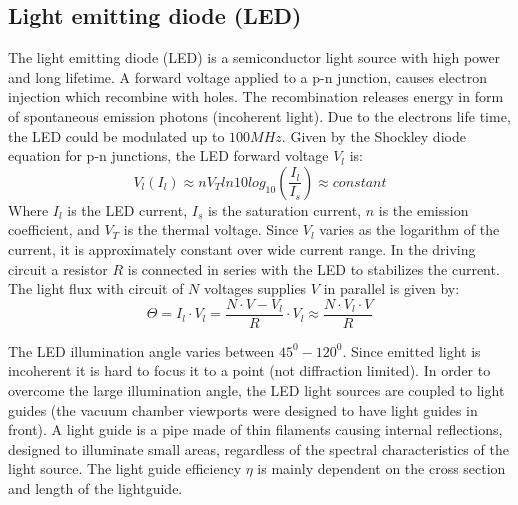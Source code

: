 \documentclass[\main/master.tex]{subfiles}
\begin{document}
\subsection{Light emitting diode (LED)}
The light emitting diode (LED) is a semiconductor light source with high power and long lifetime. A forward voltage applied to a p-n junction, causes electron injection which recombine with holes. The recombination releases energy in form of spontaneous emission photons (incoherent light). Due to the electrons life time, the LED could be modulated up to $100MHz$. Given by the Shockley diode equation for p-n junctions, the LED forward voltage $V_l$ is:
\begin{equation}
V_l(I_l) \approx n V_T ln10 log_{10} (\frac{I_l}{I_s})\approx constant \label{eqn:led voltage}
\end{equation}
Where $I_l$ is the LED current, $I_s$ is the saturation current, $n$ is the emission coefficient, and $V_T$ is the thermal voltage. Since $V_l$ varies as the logarithm of the current, it is approximately constant over wide current range. In the driving circuit a resistor $R$ is connected in series with the LED to stabilizes the current. The light flux with circuit of $N$ voltages supplies $V$ in parallel is given by:
\begin{equation}
\Theta = I_l\cdot V_l  =\frac{N\cdot V-V_l}{R}\cdot V_l\approx \frac{N\cdot V_l\cdot V}{R}\label{eqn:led power}
\end{equation}
\par\noindent
The LED illumination angle varies between $45^0-120^0$. Since emitted light is incoherent it is hard to focus it to a point (not diffraction limited). In order to overcome the large illumination angle, the LED light sources are coupled to light guides (the vacuum chamber viewports were designed to have light guides in front). A light guide is a pipe made of thin filaments causing internal reflections, designed to illuminate small areas, regardless of the spectral characteristics of the light source. The light guide efficiency $\eta$ is mainly dependent on the cross section and length of the lightguide. 
\end{document}
